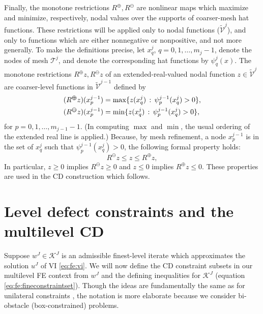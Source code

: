 \documentclass[letterpaper,final,12pt,reqno]{amsart}
\theoremstyle{cstyle}
\theoremstyle{cstyle*}
\theoremstyle{dstyle}
\numberwithin{equation}{section}
\numberwithin{figure}{section}
\numberwithin{table}{section}
\numberwithin{theorem}{section}
\newcommand{\cK}{\mathcal{K}}
\newcommand{\maxR}{R^{\bm{\oplus}}}
\newcommand{\minR}{R^{\bm{\ominus}}}
\begin{document}
Finally, the monotone restrictions $\maxR,\minR$ are nonlinear maps which maximize and minimize, respectively, nodal values over the supports of coarser-mesh hat functions.  These restrictions will be applied only to nodal functions ($\tilde{\mathcal{V}}^j$), and only to functions which are either nonnegative or nonpositive, and not more generally.  To make the definitions precise, let $x_q^j$, $q=0,1,\dots,m_j-1$, denote the nodes of mesh $\mathcal{T}^j$, and denote the corresponding hat functions \cite{Elmanetal2014} by $\psi_q^j(x)$.  The monotone restrictions $\maxR z,\minR z$ of an extended-real-valued nodal function $z\in\tilde{\mathcal{V}}^j$ are coarser-level functions in $\tilde{\mathcal{V}}^{j-1}$ defined by
\begin{align}
(\maxR z)(x_p^{j-1}) &= \max \{z(x_q^j) \,:\, \psi_p^{j-1}(x_q^j) > 0\}, \label{eq:fe:monotonerestrictions} \\
(\minR z)(x_p^{j-1}) &= \min \{z(x_q^j) \,:\, \psi_p^{j-1}(x_q^j) > 0\}, \notag
\end{align}
for $p=0,1,\dots,m_{j-1}-1$.  (In computing $\max$ and $\min$, the usual ordering of the extended real line is applied.)  Because, by mesh refinement, a node $x_p^{j-1}$ is in the set of $x_q^j$ such that $\psi_p^{j-1}(x_q^j)>0$, the following formal property holds:
\begin{equation}
\minR z \le z \le \maxR z,  \label{eq:fe:monotonerestrictionprops}
\end{equation}
In particular, $z\ge 0$ implies $\minR z \ge 0$ and $z \le 0$ implies $\maxR z \le 0$.  These properties are used in the CD construction which follows.


\section{Level defect constraints and the multilevel CD} \label{sec:ldcs}

Suppose $w^J \in \cK^J$ is an admissible finest-level iterate which approximates the solution $u^J$ of VI \eqref{eq:fe:vi}.  We will now define the CD constraint subsets in our multilevel FE context from $w^J$ and the defining inequalities for $\cK^J$ (equation \eqref{eq:fe:fineconstraintset}).  Though the ideas are fundamentally the same as for unilateral constraints \cite{GraeserKornhuber2009}, the notation is more elaborate because we consider bi-obstacle (box-constrained) problems.
\end{document}
